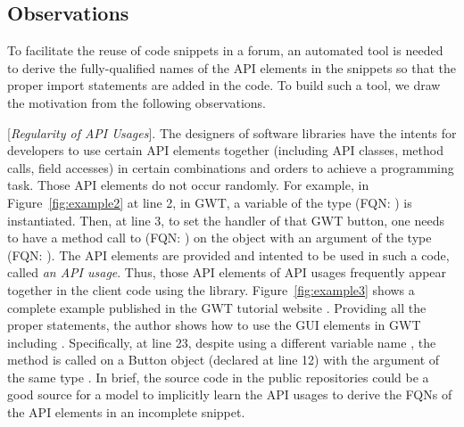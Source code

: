



\subsection{Observations}
\label{sec:obs}

To facilitate the reuse of code snippets in a forum, an automated tool
is needed to derive the fully-qualified names of the API elements in
the snippets so that the proper import statements are added in the
code. To build such a tool, we draw the motivation from the following
observations.

\vspace{2pt}
 [{\em Regularity of API Usages}]. The
designers of software libraries have the intents for developers to use
certain API elements together (including API classes, method calls,
field accesses) in certain combinations and orders to achieve a
programming task. Those API elements do not occur randomly. For
example, in Figure~\ref{fig:example2} at line 2, in GWT, a variable of
the type  (FQN:
) is instantiated. Then, at
line 3, to set the handler of that GWT button, one needs to have a
method call to  (FQN:
) on
the  object with an argument of the type
 (FQN:
).  The
API elements are provided and intented to be used in such a code,
called {\em an API usage}. Thus, those API elements of API usages
frequently appear together in the client code using the
library. Figure~\ref{fig:example3} shows a complete example published
in the GWT tutorial website . Providing all the
proper  statements, the author shows how to use the GUI
elements in GWT including . Specifically, at line 23,
despite using a different variable name , the
method  is called on a Button object (declared
at line 12) with the argument of the same type . In
brief, the source code in the public repositories could be a good
source for a model to implicitly learn the API usages to derive the
FQNs of the API elements in an incomplete snippet.



